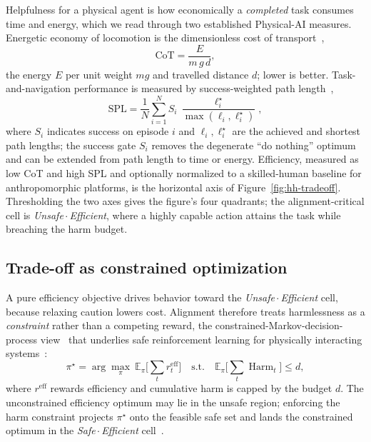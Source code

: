 \documentclass[11pt]{article}
\newcommand{\Harm}{\operatorname{Harm}}
\begin{document}
Helpfulness for a physical agent is how economically a \emph{completed} task consumes time and energy, which we read through two established Physical-AI measures. Energetic economy of locomotion is the dimensionless cost of transport~\cite{collins2005},
\begin{equation}
  \mathrm{CoT}=\frac{E}{m\,g\,d},
\end{equation}
the energy \(E\) per unit weight \(mg\) and travelled distance \(d\); lower is better. Task-and-navigation performance is measured by success-weighted path length~\cite{anderson2018},
\begin{equation}
  \mathrm{SPL}=\frac{1}{N}\sum_{i=1}^{N} S_i\,\frac{\ell_i^{\star}}{\max(\ell_i,\ell_i^{\star})},
\end{equation}
where \(S_i\) indicates success on episode \(i\) and \(\ell_i,\ell_i^{\star}\) are the achieved and shortest path lengths; the success gate \(S_i\) removes the degenerate ``do nothing'' optimum and can be extended from path length to time or energy. Efficiency, measured as low CoT and high SPL and optionally normalized to a skilled-human baseline for anthropomorphic platforms, is the horizontal axis of Figure~\ref{fig:hh-tradeoff}. Thresholding the two axes gives the figure's four quadrants; the alignment-critical cell is \emph{Unsafe\,\(\cdot\)\,Efficient}, where a highly capable action attains the task while breaching the harm budget.

\subsection*{Trade-off as constrained optimization}

A pure efficiency objective drives behavior toward the \emph{Unsafe\,\(\cdot\)\,Efficient} cell, because relaxing caution lowers cost. Alignment therefore treats harmlessness as a \emph{constraint} rather than a competing reward, the constrained-Markov-decision-process view~\cite{altman1999} that underlies safe reinforcement learning for physically interacting systems~\cite{achiam2017}:
\begin{equation}
  \pi^{\star}=\arg\max_{\pi}\ \mathbb{E}_{\pi}\!\Big[\textstyle\sum_t r^{\mathrm{eff}}_t\Big]
  \quad\text{s.t.}\quad
  \mathbb{E}_{\pi}\!\Big[\textstyle\sum_t \Harm_t\Big]\le d,
\end{equation}
where \(r^{\mathrm{eff}}\) rewards efficiency and cumulative harm is capped by the budget \(d\). The unconstrained efficiency optimum may lie in the unsafe region; enforcing the harm constraint projects \(\pi^{\star}\) onto the feasible safe set and lands the constrained optimum in the \emph{Safe\,\(\cdot\)\,Efficient} cell~\cite{achiam2017}.
\end{document}
